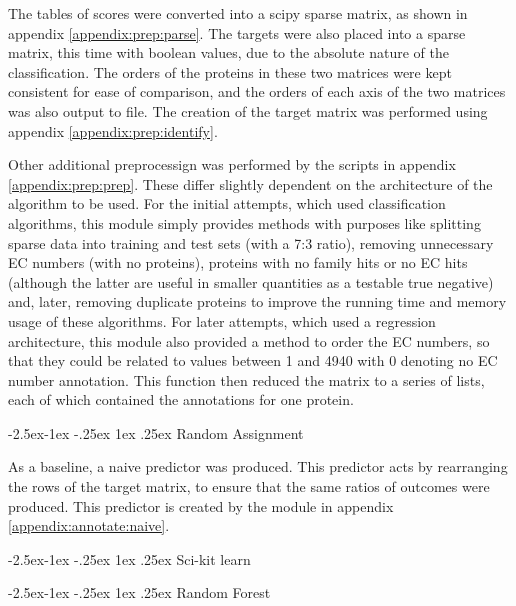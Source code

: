 \documentclass[12pt]{article}
\makeatletter
\renewcommand\subsubsection{\@startsection{subsubsection}{4}{\z@}
            {-2.5ex\@plus -1ex \@minus -.25ex}
            {1ex \@plus .25ex}
            {\normalfont\large\bfseries}}
\renewcommand\subsection{\@startsection{subsection}{4}{\z@}
            {-2.5ex\@plus -1ex \@minus -.25ex}
            {1ex \@plus .25ex}
            {\normalfont\Large\bfseries}}
\makeatother
\begin{document}
		The tables of scores were converted into a scipy \citep{RefWorks:doc:5dd556c9e4b029f578deb63c} sparse matrix, as shown in appendix \ref{appendix:prep:parse}.  The targets were also placed into a sparse matrix, this time with boolean values, due to the absolute nature of the classification.  The orders of the proteins in these two matrices were kept consistent for ease of comparison, and the orders of each axis of the two matrices was also output to file.  The creation of the target matrix was performed using appendix \ref{appendix:prep:identify}.  
		
		Other additional preprocessign was performed by the scripts in appendix \ref{appendix:prep:prep}.  These differ slightly dependent on the architecture of the algorithm to be used.  For the initial attempts, which used classification algorithms, this module simply provides methods with purposes like splitting sparse data into training and test sets (with a 7:3 ratio), removing unnecessary EC numbers (with no proteins), proteins with no family hits or no EC hits (although the latter are useful in smaller quantities as a testable true negative) and, later, removing duplicate proteins to improve the running time and memory usage of these algorithms.  For later attempts, which used a regression architecture, this module also provided a method to order the EC numbers, so that they could be related to values between 1 and 4940 with 0 denoting no EC number annotation.  This function then reduced the matrix to a series of lists, each of which contained the annotations for one protein.  
		
		\subsection{Random Assignment}
		
		As a baseline, a naive predictor was produced.  This predictor acts by rearranging the rows of the target matrix, to ensure that the same ratios of outcomes were produced.  This predictor is created by the module in appendix \ref{appendix:annotate:naive}.
		
		\subsection{Sci-kit learn}

			\subsubsection{Random Forest}
			
\end{document}
